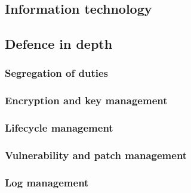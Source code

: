 \documentclass{article}
\begin{document}
\begin{desctiption}
\subsection{Information technology}
\subsection{Defence in depth}
\subsubsection{Segregation of duties}
\subsubsection{Encryption and key management} %
\subsubsection{Lifecycle management}
\subsubsection{Vulnerability and patch management}
\subsubsection{Log management}


\end{desctiption}
\end{document}
